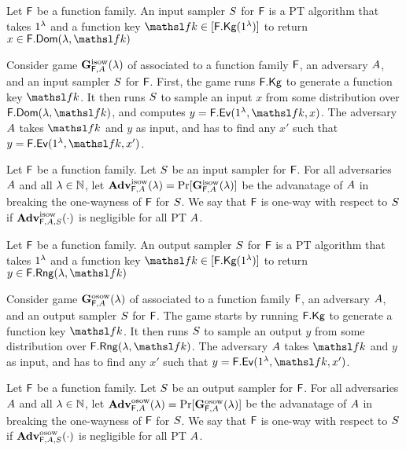 Let $\mathsf{F}$ be a function family.
An input sampler $S$ for $\mathsf{F}$ is a PT algorithm that takes $1^\lambda$ and a function key $\FKey\in[\Kg{\FF}(\secIn)]$ to return $x\in\Dom{\FF}(\secParam,\FKey)$

Consider game $\mathbf{G}^{\rm isow}_{\mathsf{F},A}(\lambda)$ of  associated to a function family $\mathsf{F}$, an adversary $A$, and an input sampler $S$ for $\mathsf{F}$.
First, the game runs $\mathsf{F}.\mathsf{Kg}$ to generate a function key $\FKey$.
It then runs $S$ to sample an input $x$ from some distribution over $\Dom{\FF}(\secParam,\FKey)$, and computes $y=\Ev{\FF}(\secIn,\FKey,x)$.
The adversary $A$ takes $\FKey$ and $y$ as input, and has to find any $x'$ such that $y=\Ev{\FF}(\secIn,\FKey,x')$.
\begin{defn}
  Let $\mathsf{F}$ be a function family.
  Let $S$ be an input sampler for $\mathsf{F}$.
  For all adversaries $A$ and all $\lambda\in{{\mathbb N}}$, let $\mathbf{Adv}^{\rm isow}_{\mathsf{F},A}(\lambda)=\Pr[\mathbf{G}^{\rm isow}_{\mathsf{F},A}(\lambda)]$ be the advanatage of $A$ in breaking the one-wayness of $\mathsf{F}$ for $S$.
  We say that $\mathsf{F}$ is one-way with respect to $S$ if $\mathbf{Adv}^{\rm isow}_{\mathsf{F},A,S}(\cdot)$ is negligible for all PT $A$.
\end{defn}

Let $\mathsf{F}$ be a function family.
An output sampler $S$ for $\mathsf{F}$ is a PT algorithm that takes $1^\lambda$ and a function key $\FKey\in[\Kg{\FF}(\secIn)]$ to return $y\in\Rng{\FF}(\secParam,\FKey)$

Consider game $\mathbf{G}^{\rm osow}_{\mathsf{F},A}(\lambda)$ of  associated to a function family $\mathsf{F}$, an adversary $A$, and an output sampler $S$ for $\mathsf{F}$.
The game starts by running $\mathsf{F}.\mathsf{Kg}$ to generate a function key $\FKey$.
It then runs $S$ to sample an output $y$ from some distribution over $\Rng{\FF}(\secParam,\FKey)$.
The adversary $A$ takes $\FKey$ and $y$ as input, and has to find any $x'$ such that $y=\Ev{\FF}(\secIn,\FKey,x')$.
\begin{defn}
  Let $\mathsf{F}$ be a function family.
  Let $S$ be an output sampler for $\mathsf{F}$.
  For all adversaries $A$ and all $\lambda\in{{\mathbb N}}$, let $\mathbf{Adv}^{\rm osow}_{\mathsf{F},A}(\lambda)=\Pr[\mathbf{G}^{\rm osow}_{\mathsf{F},A}(\lambda)]$ be the advanatage of $A$ in breaking the one-wayness of $\mathsf{F}$ for $S$.
  We say that $\mathsf{F}$ is one-way with respect to $S$ if $\mathbf{Adv}^{\rm osow}_{\mathsf{F},A,S}(\cdot)$ is negligible for all PT $A$.
\end{defn}

